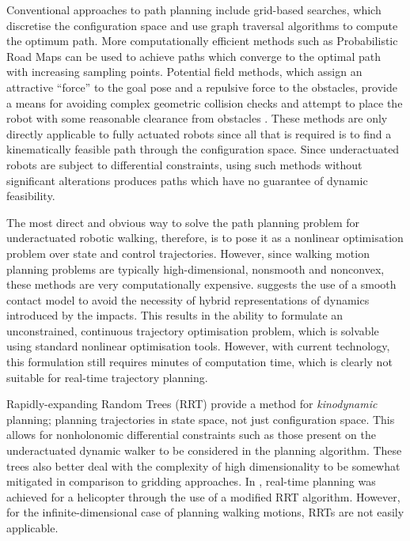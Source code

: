 Conventional approaches to path planning include grid-based searches, which discretise the configuration space and use graph traversal algorithms to compute the optimum path. More computationally efficient methods such as Probabilistic Road Maps \cite{boor1999gaussian} can be used to achieve paths which converge to the optimal path with increasing sampling points. Potential field methods, which assign an attractive ``force'' to the goal pose and a repulsive force to the obstacles, provide a means for avoiding complex geometric collision checks and attempt to place the robot with some reasonable clearance from obstacles \cite{hwang1992potential}. These methods are only directly applicable to fully actuated robots since all that is required is to find a kinematically feasible path through the configuration space. Since underactuated robots are subject to differential constraints, using such methods without significant alterations produces paths which have no guarantee of dynamic feasibility. 

The most direct and obvious way to solve the path planning problem for underactuated robotic walking, therefore, is to pose it as a nonlinear optimisation problem over state and control trajectories. However, since walking motion planning problems are typically high-dimensional, nonsmooth and nonconvex, these methods are very computationally expensive. \cite{tassa2012synthesis} suggests the use of a smooth contact model to avoid the necessity of hybrid representations of dynamics introduced by the impacts. This results in the ability to formulate an unconstrained, continuous trajectory optimisation problem, which is solvable using standard nonlinear optimisation tools. However, with current technology, this formulation still requires minutes of computation time, which is clearly not suitable for real-time trajectory planning. 

Rapidly-expanding Random Trees (RRT) \cite{lavalle2001randomized} provide a method for \textit{kinodynamic} planning; planning trajectories in state space, not just configuration space. This allows for nonholonomic differential constraints such as those present on the underactuated dynamic walker to be considered in the planning algorithm. These trees also better deal with the complexity of high dimensionality to be somewhat mitigated in comparison to gridding approaches. In \cite{frazzoli2002real}, real-time planning was achieved for a helicopter through the use of a modified RRT algorithm. However, for the infinite-dimensional case of planning walking motions, RRTs are not easily applicable. %

